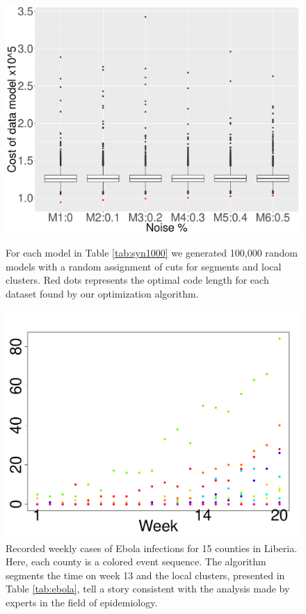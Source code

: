 \begin{figure}[h!]
\begin{minipage}[t]{0.22\textwidth}
\includegraphics[width=\linewidth,keepaspectratio=true]{images/random.pdf}
   \caption{For each model in Table \ref{tab:syn1000} we generated 100,000 random models with a random assignment of cuts for segments and local clusters. Red dots represents the optimal code length for each dataset found by our optimization algorithm.}
    \label{fig:random}
\end{minipage}
\hspace*{\fill}
\begin{minipage}[t]{0.23\textwidth}
\includegraphics[width=\linewidth,keepaspectratio=true]{images/ebola.pdf}
   \caption{Recorded weekly cases of Ebola infections for 15 counties in Liberia. Here, each county is a colored event sequence. The algorithm segments  the time on week 13 and the local clusters, presented in Table \ref{tab:ebola}, tell a story consistent with the analysis made by experts in the field of epidemiology. 
}
  \label{fig:ebola}
\end{minipage}
\end{figure}  

